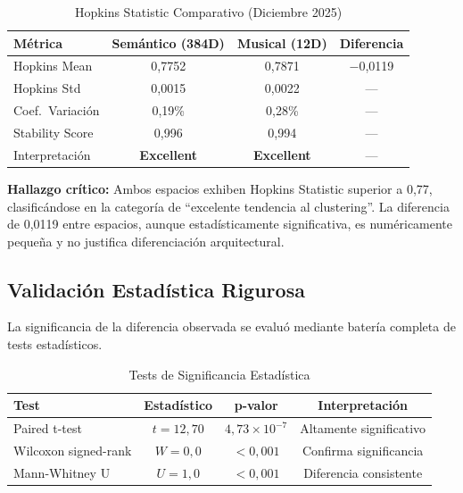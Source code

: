 \begin{table}[htbp]
\centering
\caption{Hopkins Statistic Comparativo (Diciembre 2025)}
\label{tab:hopkins-comparativo}
\begin{tabular}{lccc}
\toprule
\textbf{Métrica} & \textbf{Semántico (384D)} & \textbf{Musical (12D)} & \textbf{Diferencia} \\
\midrule
Hopkins Mean & 0,7752 & 0,7871 & $-$0,0119 \\
Hopkins Std & 0,0015 & 0,0022 & --- \\
Coef.\ Variación & 0,19\% & 0,28\% & --- \\
Stability Score & 0,996 & 0,994 & --- \\
Interpretación & \textbf{Excellent} & \textbf{Excellent} & --- \\
\bottomrule
\end{tabular}
\end{table}

\textbf{Hallazgo crítico:} Ambos espacios exhiben Hopkins Statistic superior a 0,77, clasificándose en la categoría de ``excelente tendencia al clustering''. La diferencia de 0,0119 entre espacios, aunque estadísticamente significativa, es numéricamente pequeña y no justifica diferenciación arquitectural.

\subsection{Validación Estadística Rigurosa}
\label{subsec:validacion-estadistica-hopkins}

La significancia de la diferencia observada se evaluó mediante batería completa de tests estadísticos.

\begin{table}[htbp]
\centering
\caption{Tests de Significancia Estadística}
\label{tab:tests-significancia}
\begin{tabular}{lccc}
\toprule
\textbf{Test} & \textbf{Estadístico} & \textbf{p-valor} & \textbf{Interpretación} \\
\midrule
Paired t-test & $t = 12{,}70$ & $4{,}73 \times 10^{-7}$ & Altamente significativo \\
Wilcoxon signed-rank & $W = 0{,}0$ & $< 0{,}001$ & Confirma significancia \\
Mann-Whitney U & $U = 1{,}0$ & $< 0{,}001$ & Diferencia consistente \\
\bottomrule
\end{tabular}
\end{table}

